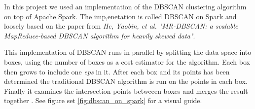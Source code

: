  In this project we used an implementation of the DBSCAN clustering algorithm on top of Apache Spark. The imp,enetation is called DBSCAN on Spark \cite{dbscan_on_spark} and loosely based on the paper from \textit{He, Yaobin, et al. "MR-DBSCAN: a scalable MapReduce-based DBSCAN algorithm for heavily skewed data"}.
 
  This implementation of DBSCAN runs in parallel by splitting the data space into boxes, using the number of boxes as a cost estimator for the algorithm. Each box then grows to include one \textit{eps} in it. After each box and its points has been determined the traditional DBSCAN algorithm is run on the points in each box. Finally it examines the intersection points betweeen boxes and merges the result together \cite{vis_dbscan_on_spark}. See figure set \autoref{fig:dbscan_on_spark} for a visual guide. 
 
